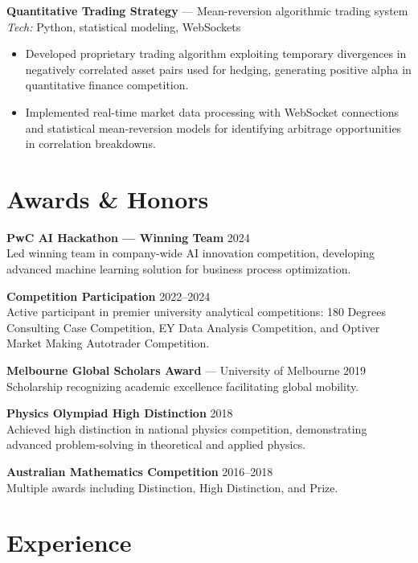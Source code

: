 \documentclass[10pt,letterpaper]{article}
\begin{document}
\begin{samepage}
\textbf{Quantitative Trading Strategy} — Mean-reversion algorithmic trading system \hfill \\
\emph{Tech:} Python, statistical modeling, WebSockets\\[-1.1em]
\begin{itemize}
  \item Developed proprietary trading algorithm exploiting temporary divergences in negatively correlated asset pairs used for hedging, generating positive alpha in quantitative finance competition.
  \item Implemented real-time market data processing with WebSocket connections and statistical mean-reversion models for identifying arbitrage opportunities in correlation breakdowns.
\end{itemize}
\end{samepage}

\section*{Awards \& Honors}

\textbf{PwC AI Hackathon — Winning Team} \hfill 2024\\
Led winning team in company-wide AI innovation competition, developing advanced machine learning solution for business process optimization.

\textbf{Competition Participation} \hfill 2022--2024\\
Active participant in premier university analytical competitions: 180 Degrees Consulting Case Competition, EY Data Analysis Competition, and Optiver Market Making Autotrader Competition.

\textbf{Melbourne Global Scholars Award} — University of Melbourne \hfill 2019\\
Scholarship recognizing academic excellence facilitating global mobility.

\textbf{Physics Olympiad High Distinction} \hfill 2018\\
Achieved high distinction in national physics competition, demonstrating advanced problem-solving in theoretical and applied physics.

\textbf{Australian Mathematics Competition} \hfill 2016--2018\\
Multiple awards including Distinction, High Distinction, and Prize.

\clearpage
\section*{Experience}
\end{document}
